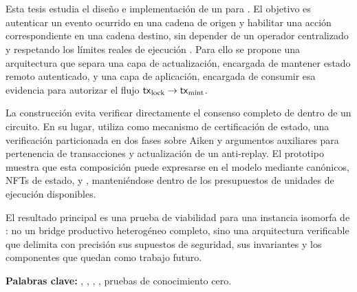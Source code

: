 \chapter*{\runtitulo}

\noindent Esta tesis estudia el diseño e implementación de un \zkBridge para \Cardano. El objetivo es autenticar un evento ocurrido en una cadena de origen y habilitar una acción correspondiente en una cadena destino, sin depender de un operador centralizado y respetando los límites reales de ejecución \Onchain. Para ello se propone una arquitectura que separa una capa de actualización, encargada de mantener estado remoto autenticado, y una capa de aplicación, encargada de consumir esa evidencia para autorizar el flujo $\mathsf{tx}_{\mathrm{lock}} \rightarrow \mathsf{tx}_{\mathrm{mint}}$.

La construcción evita verificar directamente el consenso completo de \Cardano dentro de un circuito. En su lugar, utiliza \Mithril como mecanismo de certificación de estado, una verificación \STM particionada en dos fases sobre Aiken y argumentos \Groth auxiliares para pertenencia de transacciones y actualización de un \SMT anti-replay. El prototipo muestra que esta composición puede expresarse en el modelo \eUTxO mediante \UTxOs canónicos, NFTs de estado, \ReferenceScripts y \ProofReceipt, manteniéndose dentro de los presupuestos de unidades de ejecución disponibles.

El resultado principal es una prueba de viabilidad para una instancia isomorfa de \Cardano: no un bridge productivo heterogéneo completo, sino una arquitectura verificable que delimita con precisión sus supuestos de seguridad, sus invariantes \Onchain y los componentes que quedan como trabajo futuro.

\bigskip

\noindent\textbf{Palabras clave:} \zkBridge, \Cardano, \Mithril, \eUTxO, pruebas de conocimiento cero.
